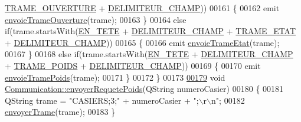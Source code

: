 \begin{DoxyCode}
      \hyperlink{_communication_8h_ad49128d4b2d459f0d7f057b2e59fb2d5}{TRAME\_OUVERTURE} + \hyperlink{_communication_8h_ac3d2c8b3b9dbc07cedf0bfa8a75d268f}{DELIMITEUR\_CHAMP}))
00161     \{
00162         emit \hyperlink{class_communication_a9fb098f5b5cb8931efefc58984529119}{envoieTrameOuverture}(trame);
00163     \}
00164     \textcolor{keywordflow}{else} \textcolor{keywordflow}{if}(trame.startsWith(\hyperlink{_communication_8h_add7c72d962d885317215f93ae8a9dc28}{EN\_TETE} + \hyperlink{_communication_8h_ac3d2c8b3b9dbc07cedf0bfa8a75d268f}{DELIMITEUR\_CHAMP} + 
      \hyperlink{_communication_8h_a57c2e74056a9338d26f264703e2158d8}{TRAME\_ETAT} + \hyperlink{_communication_8h_ac3d2c8b3b9dbc07cedf0bfa8a75d268f}{DELIMITEUR\_CHAMP}))
00165     \{
00166         emit \hyperlink{class_communication_a8beb7417ede75d0056b06788ef72d21b}{envoieTrameEtat}(trame);
00167     \}
00168     \textcolor{keywordflow}{else} \textcolor{keywordflow}{if}(trame.startsWith(\hyperlink{_communication_8h_add7c72d962d885317215f93ae8a9dc28}{EN\_TETE} + \hyperlink{_communication_8h_ac3d2c8b3b9dbc07cedf0bfa8a75d268f}{DELIMITEUR\_CHAMP} + 
      \hyperlink{_communication_8h_a3a24fc54a5e48cb3eb9786ce61933a6c}{TRAME\_POIDS} + \hyperlink{_communication_8h_ac3d2c8b3b9dbc07cedf0bfa8a75d268f}{DELIMITEUR\_CHAMP}))
00169     \{
00170         emit \hyperlink{class_communication_aaea5653e8aa1b50b4774caf65db21409}{envoieTramePoids}(trame);
00171     \}
00172 \}
00173 
\hyperlink{class_communication_ab8f5efe1d44805be0081e986b2687a12}{00179} \textcolor{keywordtype}{void} \hyperlink{class_communication_ab8f5efe1d44805be0081e986b2687a12}{Communication::envoyerRequetePoids}(QString numeroCasier)
00180 \{
00181     QString trame = \textcolor{stringliteral}{"CASIERS;3;"} + numeroCasier + \textcolor{stringliteral}{";\(\backslash\)r\(\backslash\)n"};
00182     \hyperlink{class_communication_a53c26abe4c16ff155a15929dd5ad07cf}{envoyerTrame}(trame);
00183 \}
\end{DoxyCode}
